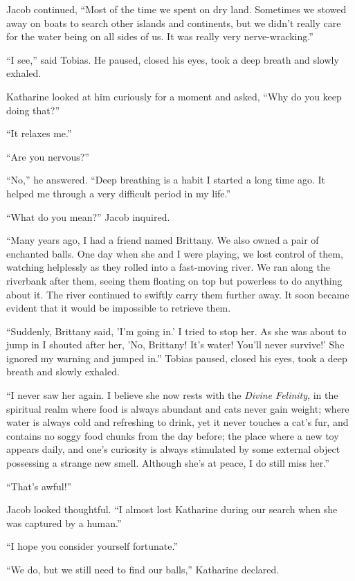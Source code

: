 Jacob continued, “Most of the time we spent on dry land. Sometimes we stowed away on boats to search other islands and continents, but we didn't really care for the water being on all sides of us. It was really very nerve-wracking.”

“I see,” said Tobias. He paused, closed his eyes, took a deep breath and slowly exhaled.

Katharine looked at him curiously for a moment and asked, “Why do you keep doing that?”

“It relaxes me.”

“Are you nervous?”

“No,” he answered. “Deep breathing is a habit I started a long time ago. It helped me through a very difficult period in my life.”

“What do you mean?” Jacob inquired.

“Many years ago, I had a friend named Brittany. We also owned a pair of enchanted balls. One day when she and I were playing, we lost control of them, watching helplessly as they rolled into a fast-moving river. We ran along the riverbank after them, seeing them floating on top but powerless to do anything about it. The river continued to swiftly carry them further away. It soon became evident that it would be impossible to retrieve them.

“Suddenly, Brittany said, 'I'm going in.' I tried to stop her. As she was about to jump in I shouted after her, 'No, Brittany! It's water! You'll never survive!' She ignored my warning and jumped in.” Tobias paused, closed his eyes, took a deep breath and slowly exhaled.

“I never saw her again. I believe she now rests with the \textit{Divine Felinity}, in the spiritual realm where food is always abundant and cats never gain weight; where water is always cold and refreshing to drink, yet it never touches a cat's fur, and contains no soggy food chunks from the day before; the place where a new toy appears daily, and one's curiosity is always stimulated by some external object possessing a strange new smell. Although she's at peace, I do still miss her.”


“That's awful!”

Jacob looked thoughtful. “I almost lost Katharine during our search when she was captured by a human.”

“I hope you consider yourself fortunate.”

“We do, but we still need to find our balls,” Katharine declared.

